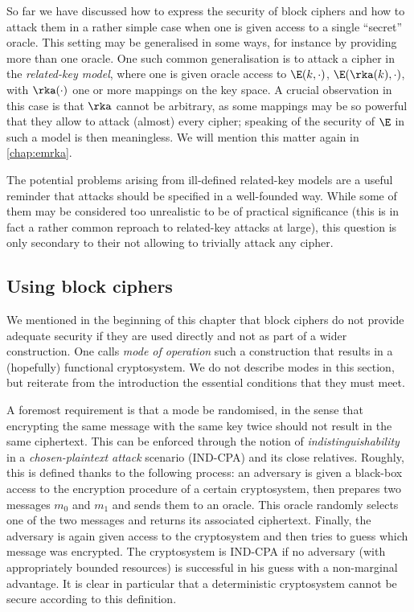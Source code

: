 So far we have discussed how to express the security of block ciphers and how to attack them in a rather simple case when one is given access to a single ``secret'' oracle. This setting may be generalised
in some ways, for instance by providing more than one oracle. One such common generalisation is to attack a cipher in the \emph{related-key model}, where one is given oracle access to
$\E(k,\cdot)$, $\E(\rka(k),\cdot)$, with $\rka(\cdot)$ one or more mappings on the key space. A crucial observation in this case is that $\rka$ cannot be arbitrary, as some mappings may
be so powerful that they allow to attack (almost) every cipher; speaking of the security of $\E$ in such a model is then meaningless. We will mention this matter again in \autoref{chap:emrka}.

The potential problems arising from ill-defined related-key models are a useful reminder that attacks should be specified in a well-founded way. While some of them may be
considered too unrealistic to be of practical significance (this is in fact a rather common reproach to related-key attacks at large), this question is only secondary to their not allowing to trivially
attack any cipher.

\subsection{Using block ciphers}

We mentioned in the beginning of this chapter that block ciphers do not provide adequate security if they are used directly and not as part of a wider construction. One calls \emph{mode
of operation} such a construction that results in a (hopefully) functional cryptosystem. We do not describe modes in this section, but reiterate from the introduction the essential conditions that they
must meet.

A foremost requirement is that a mode be randomised, in the sense that encrypting the same message with the same key twice should not result in the same ciphertext. This can be
enforced through the notion of \emph{indistinguishability} in a \emph{chosen-plaintext attack} scenario (\textsf{IND-CPA}) and its close relatives. Roughly, this is
defined thanks to the following process: an adversary is given a black-box access to the encryption procedure of a certain cryptosystem, then prepares two messages $m_0$ and $m_1$ and sends them to an oracle. This oracle randomly selects one of the two messages and
returns its associated ciphertext. Finally, the adversary is again given access to the cryptosystem and then tries to guess which message was encrypted. The cryptosystem is \textsf{IND-CPA}
if no adversary (with appropriately bounded resources) is successful in his guess with a non-marginal advantage. It is clear in particular that a deterministic cryptosystem cannot be secure according
to this definition.

